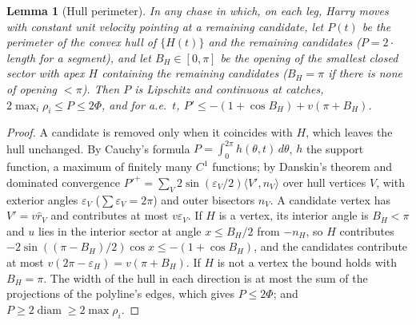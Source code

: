 \documentclass[11pt]{article}
\newtheorem{lemma}{Lemma}
\theoremstyle{remark}\newtheorem{remark}{Remark}
\newcommand{\rhat}{\hat r}
\begin{document}
\begin{lemma}[Hull perimeter]\label{lem:A34}
In any chase in which, on each leg, Harry moves with constant unit velocity pointing at a remaining candidate, let $P(t)$ be the
perimeter of the convex hull of $\{H(t)\}$ and the remaining candidates ($P=2\cdot$length for a segment), and let $B_H\in[0,\pi]$ be
the opening of the smallest closed sector with apex $H$ containing the remaining candidates ($B_H=\pi$ if there is none of opening
$<\pi$). Then $P$ is Lipschitz and continuous at catches, $2\max_i\rho_i\le P\le2\Phi$, and for a.e.\ $t$,
$P'\le-(1+\cos B_H)+v(\pi+B_H)$.
\end{lemma}
\begin{proof}
A candidate is removed only when it coincides with $H$, which leaves the hull unchanged. By Cauchy's formula $P=\int_0^{2\pi}h(\theta,t)\,d\theta$,
$h$ the support function, a maximum of finitely many $C^1$ functions; by Danskin's theorem and dominated convergence
$P'^+=\sum_V2\sin(\varepsilon_V/2)\langle V',n_V\rangle$ over hull vertices $V$, with exterior angles $\varepsilon_V$ ($\sum\varepsilon_V=2\pi$)
and outer bisectors $n_V$. A candidate vertex has $V'=v\rhat_V$ and contributes at most $v\varepsilon_V$. If $H$ is a vertex, its
interior angle is $B_H<\pi$ and $u$ lies in the interior sector at angle $x\le B_H/2$ from $-n_H$, so $H$ contributes
$-2\sin((\pi-B_H)/2)\cos x\le-(1+\cos B_H)$, and the candidates contribute at most $v(2\pi-\varepsilon_H)=v(\pi+B_H)$. If $H$ is not a vertex the
bound holds with $B_H=\pi$. The width of the hull in each direction is at most the sum of the projections of the polyline's edges,
which gives $P\le2\Phi$; and $P\ge2\operatorname{diam}\ge2\max\rho_i$.
\end{proof}
\end{document}
